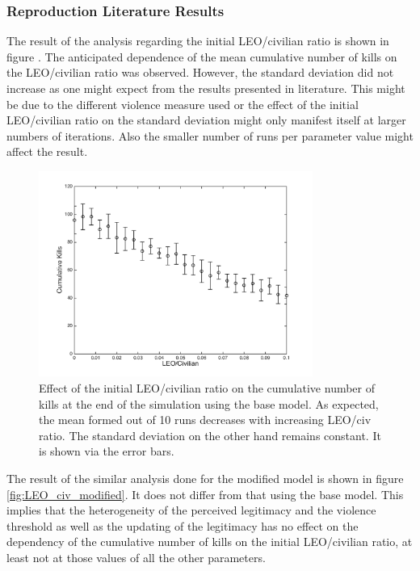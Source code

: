 \documentclass[11pt]{article}
\begin{document}
\subsubsection{Reproduction Literature Results}
The result of the analysis regarding the initial LEO/civilian ratio is shown in figure \label{fig:LEO_civ_base}. The anticipated dependence of the mean cumulative number of kills on the LEO/civilian ratio was observed. However, the standard deviation did not increase as one might expect from the results presented in literature. This might be due to the different violence measure used or the effect of the initial LEO/civilian ratio on the standard deviation might only manifest itself at larger numbers of iterations. Also the smaller number of runs per parameter value might affect the result.
\begin{figure}[!htbp]
	\centering
		\includegraphics[width=0.80\textwidth]{../../code/base_model/cum_kills_vs_LEO_civ.png}
	\caption{Effect of the initial LEO/civilian ratio on the cumulative number of kills at the end of the simulation using the base model. As expected, the mean formed out of 10 runs decreases with increasing LEO/civ ratio. The standard deviation on the other hand remains constant. It is shown via the error bars.}
	\label{fig:LEO_civ_base}
\end{figure}
The result of the similar analysis done for the modified model is shown in figure \ref{fig:LEO_civ_modified}. It does not differ from that using the base model. This implies that the heterogeneity of the perceived legitimacy and the violence threshold as well as the updating of the legitimacy has no effect on the dependency of the cumulative number of kills on the initial LEO/civilian ratio, at least not at those values of all the other parameters. 
\end{document}
